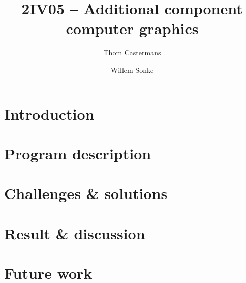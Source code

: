 \documentclass[a4paper,10pt,twoside]{article}
\title{\large 2IV05 -- Additional component computer graphics \\\huge \textbf{\accgtitle}}
\author{Thom Castermans \and Willem Sonke}
\begin{document}
\maketitle

\tableofcontents
\restoregeometry

\section{Introduction}
\label{sec:introduction}


\section{Program description}
\label{sec:description}


\section{Challenges \& solutions}
\label{sec:challenges}


\section{Result \& discussion}
\label{sec:results}


\section{Future work}
\label{sec:future-work}

\end{document}

